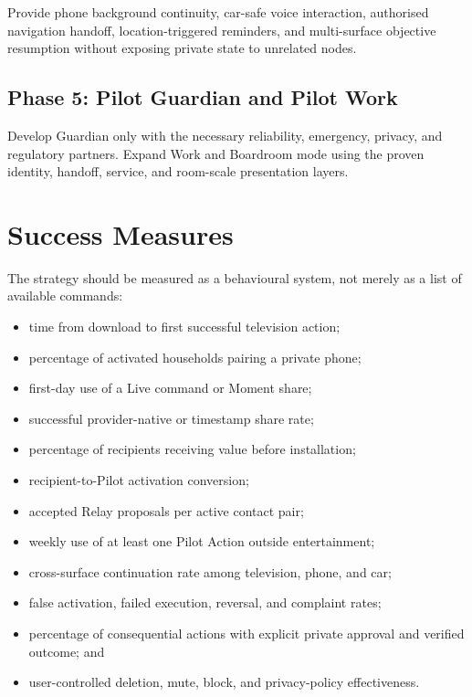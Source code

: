 \documentclass[11pt,a4paper]{article}
\begin{document}
Provide phone background continuity, car-safe voice interaction, authorised
navigation handoff, location-triggered reminders, and multi-surface objective
resumption without exposing private state to unrelated nodes.

\subsection*{Phase 5: Pilot Guardian and Pilot Work}

Develop Guardian only with the necessary reliability, emergency, privacy, and
regulatory partners.  Expand Work and Boardroom mode using the proven identity,
handoff, service, and room-scale presentation layers.

\section{Success Measures}

The strategy should be measured as a behavioural system, not merely as a list
of available commands:

\begin{itemize}[leftmargin=*]
  \item time from download to first successful television action;
  \item percentage of activated households pairing a private phone;
  \item first-day use of a Live command or Moment share;
  \item successful provider-native or timestamp share rate;
  \item percentage of recipients receiving value before installation;
  \item recipient-to-Pilot activation conversion;
  \item accepted Relay proposals per active contact pair;
  \item weekly use of at least one Pilot Action outside entertainment;
  \item cross-surface continuation rate among television, phone, and car;
  \item false activation, failed execution, reversal, and complaint rates;
  \item percentage of consequential actions with explicit private approval and
        verified outcome; and
  \item user-controlled deletion, mute, block, and privacy-policy effectiveness.
\end{itemize}
\end{document}
